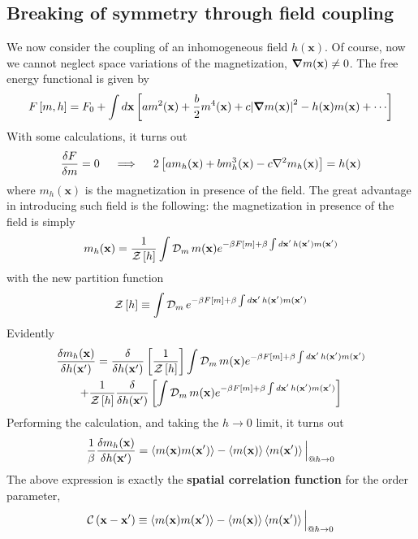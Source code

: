 \subsection{Breaking of symmetry through field coupling}\label{subsec:ising model breaking of symmetry through field coupling}

We now consider the coupling of an inhomogeneous field $h(\mathbf{x})$. Of course, now we cannot neglect space variations of the magnetization, $\grad m(\mathbf{x}) \neq 0$. The free energy functional is given by
\[ 
    F\left[{m,h}\right] = F_0 + \int d\mathbf{x} \left[{
        a m^2 (\mathbf{x}) + \frac{b}{2} m^4 (\mathbf{x}) + c \abs{\grad m(\mathbf{x})}^2 - h(\mathbf{x}) m(\mathbf{x}) + \cdots
    }\right]
\]
With some calculations, it turns out
\begin{equation}\label{eq:extremization of free energy due to external field}
    \fdv{F}{m} = 0
    \quad\implies\quad
    2 \lrS{ am_h (\mathbf{x}) + b m_h^3 (\mathbf{x})  - c \laplacian m_h (\mathbf{x}) } = h(\mathbf{x})
\end{equation}
where $m_h (\mathbf{x})$ is the magnetization in presence of the field. The great advantage in introducing such field is the following: the magnetization in presence of the field is simply
\[
    m_h(\mathbf{x}) = \frac{1}{\mathcal{Z}\left[{h}\right]} \int \mathcal{D}_m \, m(\mathbf{x}) e^{-\beta F\left[{m}\right] + \beta \int d\mathbf{x}' \, h(\mathbf{x}') m(\mathbf{x}')}
\]
with the new partition function
\[
    \mathcal{Z}\left[{h}\right] \equiv \int \mathcal{D}_m \, e^{-\beta F\left[{m}\right] + \beta \int d\mathbf{x}' \, h(\mathbf{x}') m(\mathbf{x}')}
\]
Evidently
\begin{multline*}
    \fdv{m_h (\mathbf{x})}{h(\mathbf{x}')} = \fdv{}{{h(\mathbf{x}')}} \lrS{\frac{1}{\mathcal{Z}\lrS{h}}} \int \mathcal{D}_m \, m(\mathbf{x}) e^{-\beta F\lrS{m} + \beta \int d\mathbf{x}' \, h(\mathbf{x}') m(\mathbf{x}')} \\
    + \frac{1}{\mathcal{Z}\lrS{h}} \fdv{}{{h(\mathbf{x}')}} \lrS{\int \mathcal{D}_m \, m(\mathbf{x}) e^{-\beta F\lrS{m} + \beta \int d\mathbf{x}' \, h(\mathbf{x}') m(\mathbf{x}')}}
\end{multline*}
Performing the calculation, and taking the $h \to 0$ limit, it turns out
\[
    \frac{1}{\beta} \fdv{m_h (\mathbf{x})}{h(\mathbf{x}')} = \ev{ m(\mathbf{x}) m(\mathbf{x}') } - \ev{ \vphantom{x'} m(\mathbf{x}) } \ev{ m(\mathbf{x}') } \Big|_{@ h \to 0}
\]
The above expression is exactly the \textbf{spatial correlation function} for the order parameter,
\[
    \mathcal{C} \lrR{ \mathbf{x} - \mathbf{x}' } \equiv \ev{ m(\mathbf{x}) m(\mathbf{x}') } - \ev{ \vphantom{x'} m(\mathbf{x}) } \ev{ m(\mathbf{x}') } \Big|_{@ h \to 0}
\]
